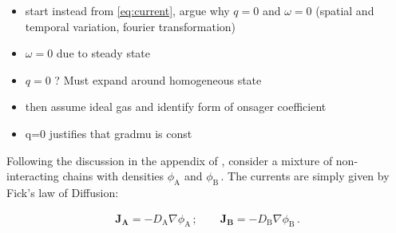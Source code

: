 \documentclass[bachelor,       %
               twoside,        %
               BCOR10mm,       %
                ngerman,english  %
               ]{GAUBM}
\begin{document}










\begin{itemize}
  \item start instead from \eqref{eq:current}, argue why $q=0$ and $\omega=0$ (spatial and temporal variation, fourier transformation)
  \item $\omega=0$ due to steady state
  \item $q=0$ ? Must expand around homogeneous state
  \item then assume ideal gas and identify form of onsager coefficient
  \item q=0 justifies that gradmu is const
\end{itemize}

Following the discussion in the appendix of \cite{deGennes80}, consider a mixture of non-interacting chains with densities $\phi_\mathrm A$ and $\phi_\mathrm B\,.$ The currents are simply given by Fick's law of Diffusion:


\begin{align}
  \mathbf{J_A}=-D_\mathrm A\nabla\phi_\mathrm A\,; \qquad \mathbf{J_B}=-D_\mathrm B\nabla\phi_\mathrm B\,.
\end{align}
\end{document}
